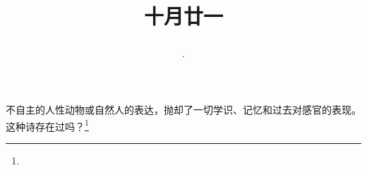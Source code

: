 \title{\date[d=21,m=11,y=2024][year:cn-y,年,month:cn,day:cn,日,·,weekday]·十月廿一 }
不自主的人性动物或自然人的表达，抛却了一切学识、记忆和过去对感官的表现。这种诗存在过吗？\footnote{ }

